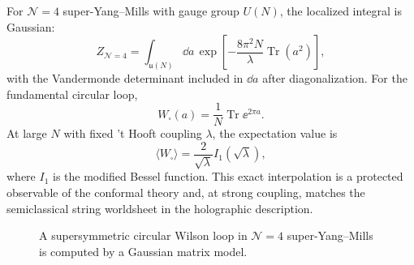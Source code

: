 For \(\mathcal N=4\) super-Yang--Mills with gauge group \(U(N)\), the
localized integral is Gaussian:
\begin{equation}
  Z_{\mathcal N=4}
  =
  \int_{\mathfrak u(N)}\dd a\,
  \exp\left[-\frac{8\pi^2N}{\lambda}\operatorname{Tr}(a^2)\right],
  \label{eq:n4-gaussian-matrix-model}
\end{equation}
with the Vandermonde determinant included in \(\dd a\) after diagonalization.
For the fundamental circular loop,
\[
  W_\square(a)=\frac1N\operatorname{Tr}\ee^{2\pi a}.
\]
At large \(N\) with fixed 't Hooft coupling \(\lambda\), the expectation value
is
\begin{equation}
  \langle W_\square\rangle
  =
  \frac{2}{\sqrt\lambda}I_1(\sqrt\lambda),
  \label{eq:n4-large-n-wilson-loop}
\end{equation}
where \(I_1\) is the modified Bessel function.  This exact interpolation is a
protected observable of the conformal theory and, at strong coupling, matches
the semiclassical string worldsheet in the holographic description.

\begin{figure}[H]
  \centering
  \caption{A supersymmetric circular Wilson loop in \(\mathcal N=4\)
  super-Yang--Mills is computed by a Gaussian matrix model.}
  \label{fig:localization-wilson-loop-matrix-model}
\end{figure}

